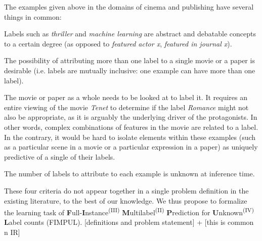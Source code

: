 The examples given above in the domains of cinema and publishing have several things in common: 
\begin{enumerate*}[label=(\arabic*)]
\item Labels such as \textit{thriller} and \textit{machine learning} are abstract and
debatable concepts to a certain degree (as opposed to \textit{featured actor
x}, \textit{featured in journal x}). 
\item The possibility of attributing more than one label to a single movie or a paper is desirable (i.e. labels are
mutually inclusive: one example can have more than one label). 
\item The movie or paper as a whole needs to be looked at to label it. It requires an entire
viewing of the movie \textit{Tenet} to determine if the label \textit{Romance}
might not also be appropriate, as it is arguably the underlying driver of the
protagonists. In other words, complex combinations of features in the movie
are related to a label. In the contrary, it would be hard to isolate elements
within these examples (such as a particular scene in a movie or a particular
expression in a paper) as uniquely predictive of a single of their labels.
\item The number of labels to attribute to each example is unknown at inference
time.
\end{enumerate*}


These four criteria do not appear together in a single problem definition in the existing literature, to the best of our knowledge. We thus propose to formalize the learning task of \textbf{F}ull-\textbf{I}nstance\textsuperscript{(III)} \textbf{M}ultilabel\textsuperscript{(II)} \textbf{P}rediction for \textbf{U}nknown\textsuperscript{(IV)} \textbf{L}abel counts (FIMPUL). [definitions and problem statement] + [this is common n IR]


